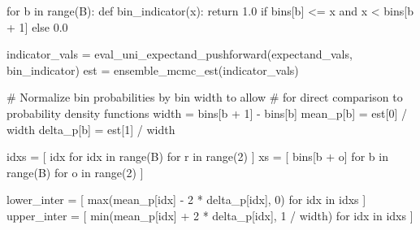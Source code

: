 \documentclass[
  letterpaper,
  DIV=11,
  numbers=noendperiod]{scrartcl}
\newenvironment{Shaded}{\begin{snugshade}}{\end{snugshade}}
\newcommand{\BuiltInTok}[1]{\textcolor[rgb]{0.00,0.23,0.31}{#1}}
\newcommand{\CommentTok}[1]{\textcolor[rgb]{0.37,0.37,0.37}{#1}}
\newcommand{\ControlFlowTok}[1]{\textcolor[rgb]{0.00,0.23,0.31}{#1}}
\newcommand{\DecValTok}[1]{\textcolor[rgb]{0.68,0.00,0.00}{#1}}
\newcommand{\FloatTok}[1]{\textcolor[rgb]{0.68,0.00,0.00}{#1}}
\newcommand{\KeywordTok}[1]{\textcolor[rgb]{0.00,0.23,0.31}{#1}}
\newcommand{\NormalTok}[1]{\textcolor[rgb]{0.00,0.23,0.31}{#1}}
\newcommand{\OperatorTok}[1]{\textcolor[rgb]{0.37,0.37,0.37}{#1}}
\begin{document}
\begin{Shaded}
\begin{Highlighting}[]
  \ControlFlowTok{for}\NormalTok{ b }\KeywordTok{in} \BuiltInTok{range}\NormalTok{(B):}
    \KeywordTok{def}\NormalTok{ bin\_indicator(x):}
      \ControlFlowTok{return} \FloatTok{1.0} \ControlFlowTok{if}\NormalTok{ bins[b] }\OperatorTok{\textless{}=}\NormalTok{ x }\KeywordTok{and}\NormalTok{ x }\OperatorTok{\textless{}}\NormalTok{ bins[b }\OperatorTok{+} \DecValTok{1}\NormalTok{] }\ControlFlowTok{else} \FloatTok{0.0}

\NormalTok{    indicator\_vals }\OperatorTok{=}\NormalTok{ eval\_uni\_expectand\_pushforward(expectand\_vals,}
\NormalTok{                                                    bin\_indicator)}
\NormalTok{    est }\OperatorTok{=}\NormalTok{ ensemble\_mcmc\_est(indicator\_vals)}

    \CommentTok{\# Normalize bin probabilities by bin width to allow}
    \CommentTok{\# for direct comparison to probability density functions}
\NormalTok{    width }\OperatorTok{=}\NormalTok{ bins[b }\OperatorTok{+} \DecValTok{1}\NormalTok{] }\OperatorTok{{-}}\NormalTok{ bins[b]}
\NormalTok{    mean\_p[b] }\OperatorTok{=}\NormalTok{ est[}\DecValTok{0}\NormalTok{] }\OperatorTok{/}\NormalTok{ width}
\NormalTok{    delta\_p[b] }\OperatorTok{=}\NormalTok{ est[}\DecValTok{1}\NormalTok{] }\OperatorTok{/}\NormalTok{ width}

\NormalTok{  idxs }\OperatorTok{=}\NormalTok{ [ idx }\ControlFlowTok{for}\NormalTok{ idx }\KeywordTok{in} \BuiltInTok{range}\NormalTok{(B) }\ControlFlowTok{for}\NormalTok{ r }\KeywordTok{in} \BuiltInTok{range}\NormalTok{(}\DecValTok{2}\NormalTok{) ]}
\NormalTok{  xs }\OperatorTok{=}\NormalTok{ [ bins[b }\OperatorTok{+}\NormalTok{ o] }\ControlFlowTok{for}\NormalTok{ b }\KeywordTok{in} \BuiltInTok{range}\NormalTok{(B) }\ControlFlowTok{for}\NormalTok{ o }\KeywordTok{in} \BuiltInTok{range}\NormalTok{(}\DecValTok{2}\NormalTok{) ]}

\NormalTok{  lower\_inter }\OperatorTok{=}\NormalTok{ [ }\BuiltInTok{max}\NormalTok{(mean\_p[idx] }\OperatorTok{{-}} \DecValTok{2} \OperatorTok{*}\NormalTok{ delta\_p[idx], }\DecValTok{0}\NormalTok{)}
                  \ControlFlowTok{for}\NormalTok{ idx }\KeywordTok{in}\NormalTok{ idxs ]}
\NormalTok{  upper\_inter }\OperatorTok{=}\NormalTok{ [ }\BuiltInTok{min}\NormalTok{(mean\_p[idx] }\OperatorTok{+} \DecValTok{2} \OperatorTok{*}\NormalTok{ delta\_p[idx], }\DecValTok{1} \OperatorTok{/}\NormalTok{ width)}
                  \ControlFlowTok{for}\NormalTok{ idx }\KeywordTok{in}\NormalTok{ idxs ]}


\end{Highlighting}
\end{Shaded}
\end{document}
